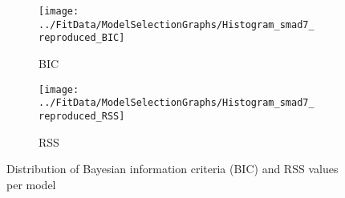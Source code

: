 \documentclass{article}
\begin{document}

    \begin{figure*}[t]
      \centering
      \begin{subfigure}{0.4\textwidth}
        \texttt{[image: ../FitData/ModelSelectionGraphs/Histogram\_smad7\_reproduced\_BIC]}
        \caption{BIC}
        \label{fig:model_selection:BIC}
      \end{subfigure}
      \begin{subfigure}{0.4\textwidth}
        \texttt{[image: ../FitData/ModelSelectionGraphs/Histogram\_smad7\_reproduced\_RSS]}
        \caption{RSS}
        \label{fig:model_selection:RSS}
      \end{subfigure}
      \caption{Distribution of Bayesian information criteria (BIC) and RSS values per model}
      \label{fig:model_selection_criteria}
    \end{figure*}
\end{document}
